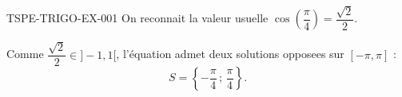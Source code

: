 \begin{corrige}{TSPE-TRIGO-EX-001}
On reconnait la valeur usuelle $\cos\!\left(\dfrac{\pi}{4}\right) = \dfrac{\sqrt{2}}{2}$.

Comme $\dfrac{\sqrt{2}}{2} \in ]-1,1[$, l'équation admet deux solutions opposees sur $[-\pi,\pi]$ :
\[
  \boxed{S = \left\{-\dfrac{\pi}{4}\,;\, \dfrac{\pi}{4}\right\}}.
\]
\end{corrige}
